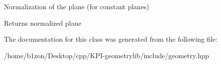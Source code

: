 Normalization of the plane (for constant planes) \begin{DoxyReturn}{Returns}
normalized plane 
\end{DoxyReturn}


The documentation for this class was generated from the following file\+:\begin{DoxyCompactItemize}
\item 
/home/b1zon/\+Desktop/cpp/\+K\+P\+I-\/geometrylib/include/geometry.\+hpp\end{DoxyCompactItemize}

